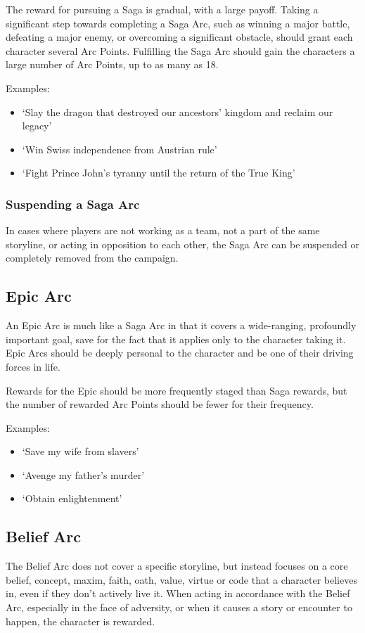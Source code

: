 \documentclass[oneside,11pt,english]{book}
\begin{document}
The reward for pursuing a Saga is gradual, with a large payoff. Taking a significant step towards 
completing a Saga Arc, such as winning a major battle, defeating a major enemy, or overcoming a 
significant obstacle, should grant each character several Arc Points. Fulfilling the Saga Arc should gain 
the characters a large number of Arc Points, up to as many as 18. 


Examples:
\begin{itemize}
\item ‘Slay the dragon that destroyed our ancestors’ kingdom and reclaim our legacy’ 
\item ‘Win Swiss independence from Austrian rule’ 
\item ‘Fight Prince John’s tyranny until the return of the True King’ 
\end{itemize} 
 
\subsubsection{Suspending a Saga Arc}
In cases where players are not working as a team, not a part of the same storyline, or acting in opposition 
to each other, the Saga Arc can be suspended or completely removed from the campaign. 

 

\subsection{Epic Arc} 
An Epic Arc is much like a Saga Arc in that it covers a wide-ranging, profoundly important goal, save for 
the fact that it applies only to the character taking it. Epic Arcs should be deeply personal to the character 
and be one of their driving forces in life. 

 
Rewards for the Epic should be more frequently staged than Saga rewards, but the number of rewarded 
Arc Points should be fewer for their frequency. 

 

Examples: 
\begin{itemize}
\item ‘Save my wife from slavers’ 
\item ‘Avenge my father’s murder’ 
\item ‘Obtain enlightenment’ 
\end{itemize}
 

\subsection{Belief Arc}
The Belief Arc does not cover a specific storyline, but instead focuses on a core belief, concept, maxim, 
faith, oath, value, virtue or code that a character believes in, even if they don’t actively live it. When 
acting in accordance with the Belief Arc, especially in the face of adversity, or when it causes a story or 
encounter to happen, the character is rewarded. 
\end{document}
